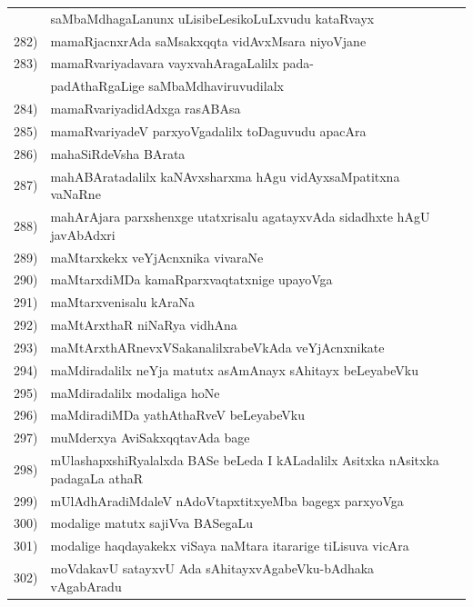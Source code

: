 {\begin{longtable}{@{}cp{7.4cm}r}
     & saMbaMdhagaLanunx uLisibeLesikoLuLxvudu kataRvayx & \pageref{page18}\\ 
282) & mamaRjacnxrAda saMsakxqqta vidAvxMsara niyoVjane & \pageref{page32}\\
283) & mamaRvariyadavara vayxvahAragaLalilx pada- & \\
     & padAthaRgaLige saMbaMdhaviruvudilalx & \pageref{page205}\\
284) & mamaRvariyadidAdxga rasABAsa & \pageref{page229}\\
285) & mamaRvariyadeV parxyoVgadalilx toDaguvudu apacAra & \pageref{page209}\\
286) & mahaSiRdeVsha BArata & \pageref{page103}\\
287) & mahABAratadalilx kaNAvxsharxma hAgu vidAyxsaMpatitxna vaNaRne & \pageref{page57}\\
288) & mahArAjara parxshenxge utatxrisalu agatayxvAda sidadhxte hAgU javAbAdxri & \pageref{page115}\\
289) & maMtarxkekx veYjAcnxnika vivaraNe & \pageref{page115}\\ 
290) & maMtarxdiMDa kamaRparxvaqtatxnige upayoVga & \pageref{page117}\\
291) & maMtarxvenisalu kAraNa & \pageref{page120}\\
292) & maMtArxthaR niNaRya vidhAna & \pageref{page118}\\
293) & maMtArxthARnevxVSakanalilxrabeVkAda veYjAcnxnikate  & \pageref{page119}\\
294) & maMdiradalilx neYja matutx asAmAnayx sAhitayx beLeyabeVku & \pageref{page78}\\ 
295) & maMdiradalilx modaliga hoNe & \pageref{page70}\\
296) & maMdiradiMDa yathAthaRveV beLeyabeVku & \pageref{page69}\\
297) & muMderxya AviSakxqqtavAda bage & \pageref{page73}\\
298) & mUlashapxshiRyalalxda BASe beLeda I kALadalilx Asitxka nAsitxka padagaLa athaR & \pageref{page189}\\
299) & mUlAdhAradiMdaleV nAdoVtapxtitxyeMba bagegx parxyoVga & \pageref{page171}\\
300) & modalige matutx sajiVva BASegaLu & \pageref{page109}\\
301) & modalige haqdayakekx viSaya naMtara itararige tiLisuva vicAra & \pageref{page131}\\
302) & moVdakavU satayxvU Ada sAhitayxvAgabeVku-bAdhaka vAgabAradu & \pageref{page78}\\

\end{longtable}}
